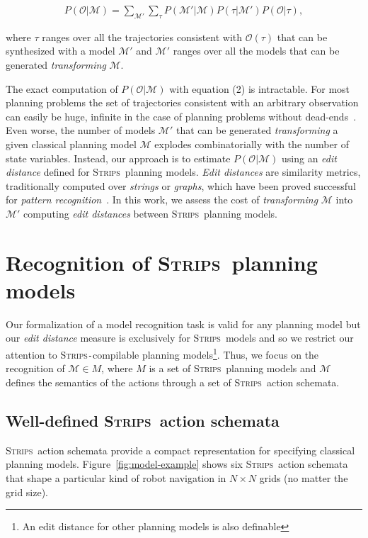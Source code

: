 \documentclass[letterpaper]{article} %
\newcommand{\strips}{\textsc{Strips}}     %
\begin{document}
\begin{align}
 P(\mathcal{O}|\mathcal{M})=\sum_{\mathcal{M}'}\sum_{\tau} P(\mathcal{M'}|\mathcal{M})P(\tau|\mathcal{M'})P(\mathcal{O}|\tau),
\end{align}

where $\tau$ ranges over all the trajectories consistent with $\mathcal{O}(\tau)$ that can be synthesized with a model $\mathcal{M}'$ and $\mathcal{M}'$ ranges over all the models that can be generated {\em transforming} $\mathcal{M}$.

The exact computation of $P(\mathcal{O}|\mathcal{M})$ with equation (2) is intractable. For most planning problems the set of trajectories consistent with an arbitrary observation can easily be huge, infinite in the case of planning problems without dead-ends~\cite{lesh1995sound}. Even worse, the number of models $\mathcal{M}'$ that can be generated {\em transforming} a given classical planning model $\mathcal{M}$ explodes combinatorially with the number of state variables. Instead, our approach is to estimate $P(\mathcal{O}|\mathcal{M})$ using an {\em edit distance} defined for \strips\ planning models. {\em Edit distances} are similarity metrics, traditionally computed over {\em strings} or {\em graphs}, which have been proved successful for {\em pattern recognition}~\cite{MasekP80,Bunke97}. In this work, we assess the cost of {\em transforming} $\mathcal{M}$ into $\mathcal{M'}$ computing {\em edit distances} between \strips\ planning models.


\section{Recognition of \strips\ planning models}
\label{sec:asPlanning}

Our formalization of a model recognition task is valid for any planning model but our \emph{edit distance} measure is exclusively for \strips\ models and so we restrict our attention to \strips\texttt{-}compilable planning models\footnote{An edit distance for other planning models is also definable}. Thus, we focus on the recognition of $\mathcal{M}\in M$, where $M$ is a set of \strips\ planning models and $\mathcal{M}$ defines the semantics of the actions through a set of \strips\ action schemata.


\subsection{Well-defined \strips\ action schemata}
\strips\ action schemata provide a compact representation for specifying classical planning models. Figure~\ref{fig:model-example} shows six \strips\ action schemata that shape a particular kind of robot navigation in $N\times N$ grids (no matter the grid size).
\end{document}
